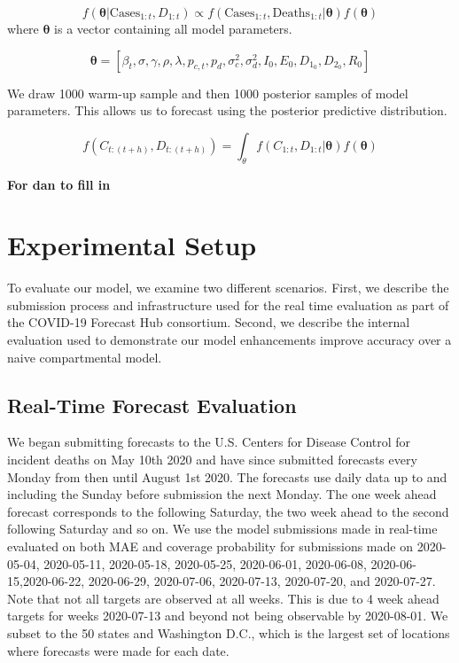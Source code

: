 \documentclass[11pt]{amsart}
\begin{document}
\begin{equation}
f(\bm{\theta} | \text{Cases}_{1:t},D_{1:t}) \propto f(\text{Cases}_{1:t},\text{Deaths}_{1:t} | \bm{\theta})f(\bm{\theta})
\end{equation}
where $\bm{\theta}$ is a vector containing all model parameters. 

\begin{equation}
\bm{\theta} =[\beta_{t} ,
\sigma ,
\gamma ,
\rho ,
\lambda ,
p_{c,t} ,
p_{d} ,
\sigma_c^2 ,
\sigma_d^2 ,
I_0 ,
E_0 ,
D_{1_0} ,
D_{2_0} ,
R_0 ]
\end{equation}

We draw 1000 warm-up sample and then 1000 posterior samples of model parameters. This allows us to forecast using the posterior predictive distribution.

\begin{equation}
f(C_{t:(t+h)}, D_{t:(t+h)}) =  \int_{\theta} f(C_{1:t},D_{1:t} | \bm{\theta})f(\bm{\theta})
\end{equation}

\textbf{For dan to fill in}
 \section{Experimental Setup}
 To evaluate our model, we examine two different scenarios. First, we describe the submission process and infrastructure used for the real time evaluation as part of the COVID-19 Forecast Hub consortium. Second, we describe the internal evaluation used to demonstrate our model enhancements improve accuracy over a naive compartmental model. 
 
 \subsection{Real-Time Forecast Evaluation}
We began submitting forecasts to the U.S. Centers for Disease Control for incident deaths on May 10th 2020 and have since submitted forecasts every Monday from then until August 1st 2020. The forecasts use daily data up to and including the Sunday before submission the next Monday. The one week ahead forecast corresponds to the following Saturday, the two week ahead to the second following Saturday and so on.  We use the model submissions made in real-time evaluated on both MAE and coverage probability for submissions made on 2020-05-04, 2020-05-11, 2020-05-18, 2020-05-25, 2020-06-01, 2020-06-08, 2020-06-15,2020-06-22, 2020-06-29, 2020-07-06, 2020-07-13, 2020-07-20, and 2020-07-27. Note that not all targets are observed at all weeks. This is due to 4 week ahead targets for weeks 2020-07-13 and beyond not being observable by 2020-08-01. We subset to the 50 states and Washington D.C., which is the largest set of locations where forecasts were made for each date. 
 
\end{document}
